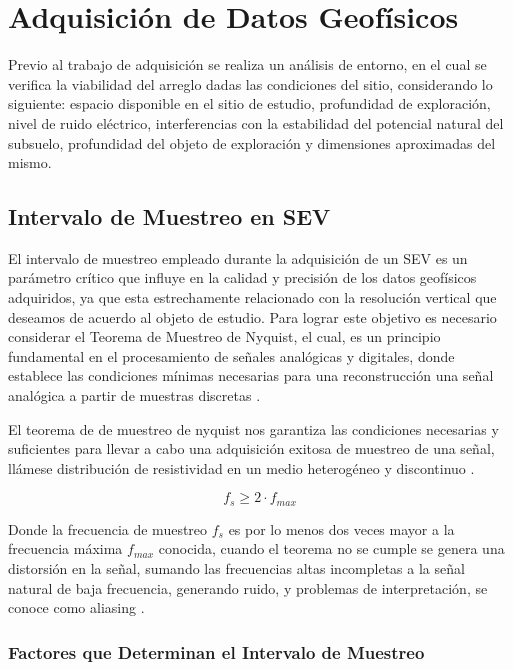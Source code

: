 	\section{Adquisición de Datos Geofísicos}
	
	Previo al trabajo de adquisición se realiza un análisis de entorno, en el cual se verifica la viabilidad del arreglo dadas las condiciones del sitio, considerando lo siguiente: espacio disponible en el sitio de estudio, profundidad de exploración, nivel de ruido eléctrico, interferencias con la estabilidad del potencial natural del subsuelo, profundidad del objeto de exploración y dimensiones aproximadas del mismo.
	
		\subsection{Intervalo de Muestreo en SEV}
		
			El intervalo de muestreo empleado durante la adquisición de un SEV es un parámetro crítico que influye en la calidad y precisión de los datos geofísicos adquiridos, ya que esta estrechamente relacionado con la resolución vertical que deseamos de acuerdo al objeto de estudio. Para lograr este objetivo es necesario considerar el Teorema de Muestreo de Nyquist, el cual, es un principio fundamental en el procesamiento de señales analógicas y digitales, donde establece las condiciones mínimas necesarias para una reconstrucción una señal analógica a partir de muestras discretas \citep{alvarado2010}.
			
			El teorema de de muestreo de nyquist nos garantiza las condiciones necesarias y suficientes para llevar a cabo una adquisición exitosa de muestreo de una señal, llámese distribución de resistividad en un medio heterogéneo y discontinuo \citep{alvarado2010}.
			
			\begin{equation}
				f_{s} \geq 2 \cdot f_{max}
			\end{equation}
			
			Donde la frecuencia de muestreo $f_{s}$ es por lo menos dos veces mayor a la frecuencia máxima $f_{max}$ conocida, cuando el teorema no se cumple se genera una distorsión en la señal, sumando las frecuencias altas incompletas a la señal natural de baja frecuencia, generando ruido, y problemas de interpretación, se conoce como aliasing \citep{alvarado2010}. 
			
			
				
			\subsubsection{Factores que Determinan el Intervalo de Muestreo}
		
